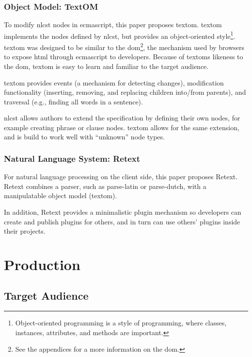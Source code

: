 \subsection{Object Model: TextOM}\label{object-model}

To modify \gls{nlcst} nodes in \gls{ecmascript}, this paper proposes
\gls{textom}. \gls{textom} implements the nodes defined by \gls{nlcst},
but provides an object-oriented style\footnote{Object-oriented
  programming is a style of programming, where classes, instances,
  attributes, and methods are important.}. \gls{textom} was designed to
be similar to the \gls{dom}\footnote{See the appendices for a more
  information on the \gls{dom}.}, the mechanism used by browsers to
expose \gls{html} through \gls{ecmascript} to developers. Because of
\glspl{textom} likeness to the \gls{dom}, \gls{textom} is easy to learn
and familiar to the target audience.

\Gls{textom} provides events (a mechanism for detecting changes),
modification functionality (inserting, removing, and replacing children
into\slash from parents), and traversal (e.g., finding all words in a
sentence).

\Gls{nlcst} allows authors to extend the specification by defining their
own nodes, for example creating phrase or clause nodes. \Gls{textom}
allows for the same extension, and is build to work well with
``unknown'' node types.

\subsection{Natural Language System:
Retext}\label{natural-language-system-retext}

For natural language processing on the client side, this paper proposes
Retext. Retext combines a parser, such as parse-latin or parse-dutch,
with a manipulatable object model (\gls{textom}).

In addition, Retext provides a minimalistic plugin mechanism so
developers can create and publish plugins for others, and in turn can
use others' plugins inside their projects.

\chapter{Production}\label{production}

\section{Target Audience}\label{target-audience}

